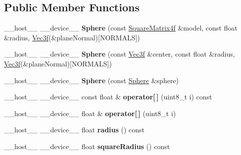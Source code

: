 \subsection*{Public Member Functions}
\begin{DoxyCompactItemize}
\item 
\+\_\+\+\_\+host\+\_\+\+\_\+ \+\_\+\+\_\+device\+\_\+\+\_\+ {\bfseries Sphere} (const \hyperlink{class_square_matrix4}{Square\+Matrix4f} \&model, const float \&radius, \hyperlink{class_vec3}{Vec3f}(\&plane\+Normal)\mbox{[}N\+O\+R\+M\+A\+LS\mbox{]})\hypertarget{class_sphere_a6202639ed0ffaf44a7eaa55953eae1f9}{}\label{class_sphere_a6202639ed0ffaf44a7eaa55953eae1f9}

\item 
\+\_\+\+\_\+host\+\_\+\+\_\+ \+\_\+\+\_\+device\+\_\+\+\_\+ {\bfseries Sphere} (const \hyperlink{class_vec3}{Vec3f} \&center, const float \&radius, \hyperlink{class_vec3}{Vec3f}(\&plane\+Normal)\mbox{[}N\+O\+R\+M\+A\+LS\mbox{]})\hypertarget{class_sphere_afb7e10efe86404fc6df407381cc8fdcd}{}\label{class_sphere_afb7e10efe86404fc6df407381cc8fdcd}

\item 
\+\_\+\+\_\+host\+\_\+\+\_\+ \+\_\+\+\_\+device\+\_\+\+\_\+ {\bfseries Sphere} (const \hyperlink{class_sphere}{Sphere} \&sphere)\hypertarget{class_sphere_af805e2d486b9a5be47852afc1636e509}{}\label{class_sphere_af805e2d486b9a5be47852afc1636e509}

\item 
\+\_\+\+\_\+host\+\_\+\+\_\+ \+\_\+\+\_\+device\+\_\+\+\_\+ const float \& {\bfseries operator\mbox{[}$\,$\mbox{]}} (uint8\+\_\+t i) const\hypertarget{class_sphere_a4e0c5c168574e71ce6126a22d64c2ce7}{}\label{class_sphere_a4e0c5c168574e71ce6126a22d64c2ce7}

\item 
\+\_\+\+\_\+host\+\_\+\+\_\+ \+\_\+\+\_\+device\+\_\+\+\_\+ float \& {\bfseries operator\mbox{[}$\,$\mbox{]}} (uint8\+\_\+t i)\hypertarget{class_sphere_adb1f756dd4a5865993d055bd27b96d07}{}\label{class_sphere_adb1f756dd4a5865993d055bd27b96d07}

\item 
\+\_\+\+\_\+host\+\_\+\+\_\+ \+\_\+\+\_\+device\+\_\+\+\_\+ float {\bfseries radius} () const\hypertarget{class_sphere_a90c900da43ea7b40e7c7e0fd66fbf8f2}{}\label{class_sphere_a90c900da43ea7b40e7c7e0fd66fbf8f2}

\item 
\+\_\+\+\_\+host\+\_\+\+\_\+ \+\_\+\+\_\+device\+\_\+\+\_\+ float {\bfseries square\+Radius} () const\hypertarget{class_sphere_a00919fefbe3c39b8b749296fbfd3d856}{}\label{class_sphere_a00919fefbe3c39b8b749296fbfd3d856}


\end{DoxyCompactItemize}
